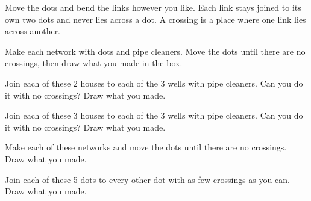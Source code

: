 \documentclass[12pt]{article}
\begin{document}
Move the dots and bend the links however you like. Each link stays joined to its own two dots and never lies across a dot. A crossing is a place where one link lies across another.

\problem Make each network with dots and pipe cleaners. Move the dots until there are no crossings, then draw what you made in the box.

\vspace{6pt}
\vspace{18pt}
\vspace{18pt}

\newpage
\problem Join each of these 2 houses to each of the 3 wells with pipe cleaners. Can you do it with no crossings? Draw what you made.

\vspace{8pt}
\noindent\begin{minipage}[c]{6.6cm}\end{minipage}\hfill\answerbox{10.4cm}{9.4cm}

\problem Join each of these 3 houses to each of the 3 wells with pipe cleaners. Can you do it with no crossings? Draw what you made.

\vspace{8pt}
\noindent\begin{minipage}[c]{6.6cm}\end{minipage}\hfill\answerbox{10.4cm}{9.4cm}

\newpage
\problem Make each of these networks and move the dots until there are no crossings. Draw what you made.

\vspace{8pt}
\vspace{16pt}
\vspace{16pt}

\newpage
\problem Join each of these 5 dots to every other dot with as few crossings as you can. Draw what you made.

\vspace{10pt}
\noindent\hspace{1.2cm}\begin{minipage}[c]{7.0cm}\end{minipage}\hspace{1.0cm}%
\begin{minipage}[c]{3.4cm}\end{minipage}
\end{document}
